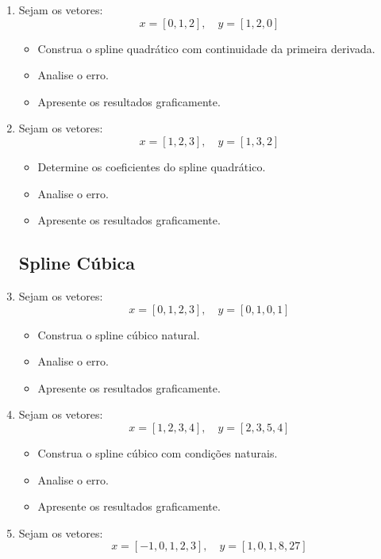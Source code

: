 \begin{enumerate}[label=\thesection.\arabic*]
\item Sejam os vetores:
\[
x = [0, 1, 2], \quad y = [1, 2, 0]
\]

\begin{itemize}
    \item Construa o spline quadrático com continuidade da primeira derivada.
    \item Analise o erro.
    \item Apresente os resultados graficamente.
\end{itemize}

\item Sejam os vetores:
\[
x = [1, 2, 3], \quad y = [1, 3, 2]
\]

\begin{itemize}
    \item Determine os coeficientes do spline quadrático.
    \item Analise o erro.
    \item Apresente os resultados graficamente.
\end{itemize}

\subsection*{Spline Cúbica}

\item Sejam os vetores:
\[
x = [0, 1, 2, 3], \quad y = [0, 1, 0, 1]
\]

\begin{itemize}
    \item Construa o spline cúbico natural.
    \item Analise o erro.
    \item Apresente os resultados graficamente.
\end{itemize}

\item Sejam os vetores:
\[
x = [1, 2, 3, 4], \quad y = [2, 3, 5, 4]
\]

\begin{itemize}
    \item Construa o spline cúbico com condições naturais.
    \item Analise o erro.
    \item Apresente os resultados graficamente.
\end{itemize}

\item Sejam os vetores:
\[
x = [-1, 0, 1, 2, 3], \quad y = [1, 0, 1, 8, 27]
\]


\end{enumerate}
